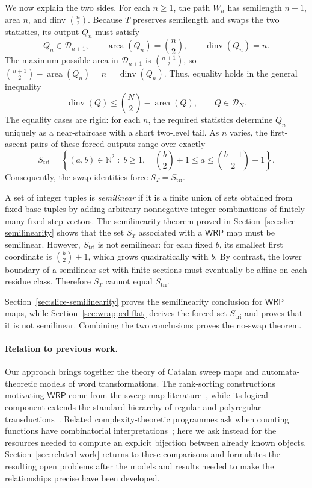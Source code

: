 \documentclass[11pt]{article}
\theoremstyle{definition}
\newcommand{\D}{\mathcal D}
\newcommand{\N}{\mathbb N}
\newcommand{\WRP}{\mathsf{WRP}}
\newcommand{\area}{\operatorname{area}}
\newcommand{\dinv}{\operatorname{dinv}}
\begin{document}
We now explain the two sides.  For each $n\ge1$, the path $W_n$ has semilength
$n+1$, area $n$, and dinv $\binom n2$.
Because $T$ preserves semilength and swaps the two statistics, its output
$Q_n$ must satisfy
\[
   Q_n\in\D_{n+1},\qquad
   \area(Q_n)=\binom n2,\qquad
   \dinv(Q_n)=n.
\]
The maximum possible area in $\D_{n+1}$ is $\binom{n+1}{2}$, so
$\binom{n+1}{2}-\area(Q_n)=n=\dinv(Q_n)$.
Thus, equality holds in the general inequality
\[
   \dinv(Q)\le \binom N2-\area(Q),
   \qquad Q\in\D_N.
\]
The equality cases are rigid: for each $n$, the required statistics determine
$Q_n$ uniquely as a near-staircase with a short two-level tail.  As $n$
varies, the first-ascent pairs of these forced outputs range over exactly
\[
   S_{\mathrm{tri}}
   =
   \left\{(a,b)\in\N^2
      \;:\;
      b\ge 1,\quad
      \binom b2+1\le a\le\binom{b+1}{2}+1
   \right\}.
\]
Consequently, the swap identities force $S_T=S_{\mathrm{tri}}$.

A set of integer tuples is \emph{semilinear} if it is a finite union of
sets obtained from fixed base tuples by adding arbitrary nonnegative integer
combinations of finitely many fixed step vectors.  The semilinearity theorem proved in
Section~\ref{sec:slice-semilinearity} shows that the set $S_T$ associated with
a $\WRP$ map must be semilinear.
However, $S_{\mathrm{tri}}$ is not semilinear: for each fixed $b$, its smallest
first coordinate is $\binom b2+1$, which grows quadratically with $b$.  By
contrast, the lower boundary of a
semilinear set with finite sections must eventually be affine on each residue
class.  Therefore $S_T$ cannot equal $S_{\mathrm{tri}}$.

Section~\ref{sec:slice-semilinearity} proves the semilinearity conclusion for
$\WRP$ maps, while Section~\ref{sec:wrapped-flat} derives the forced set
$S_{\mathrm{tri}}$ and proves that it is not semilinear.  Combining the two
conclusions proves the no-swap theorem.

\paragraph{Relation to previous work.}

Our approach brings together the theory of Catalan sweep maps and
automata-theoretic models of word transformations.  The rank-sorting
constructions motivating $\WRP$ come from the sweep-map
literature~\cite{ArmstrongLoehrWarrington2015,
ArmstrongLoehrWarrington2016,ThomasWilliams2018}, while its logical component
extends the standard hierarchy of regular and polyregular
transductions~\cite{EngelfrietHoogeboom2001,Bojanczyk2018}.  Related
complexity-theoretic programmes ask when counting functions have combinatorial
interpretations~\cite{Pak2024WhatIs,IkenmeyerPak2022}; here we ask instead for
the resources needed to compute an explicit bijection between already known
objects.  Section~\ref{sec:related-work} returns to these comparisons and
formulates the resulting open problems after the models and results needed to
make the relationships precise have been developed.
\end{document}
